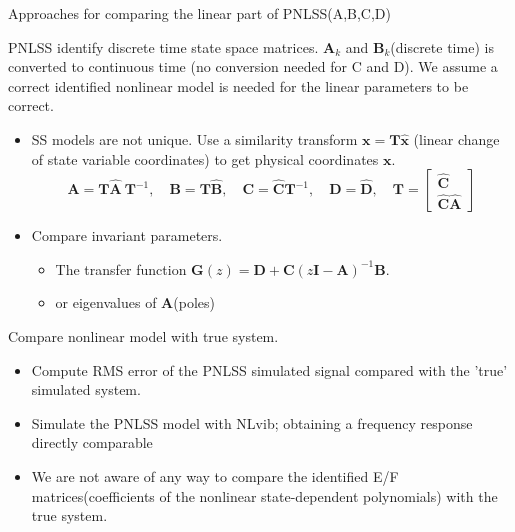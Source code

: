 \documentclass[9pt]{beamer}
\newcommand{\vect}[1]{\mathbf{#1}}
\begin{document}
\begin{frame}{Approaches for comparing the linear part of PNLSS(A,B,C,D)}

  PNLSS identify discrete time state space matrices. $\vect A_k$ and $\vect
  B_k$(discrete time) is converted to continuous time (no conversion needed for
  C and D). We assume a correct identified nonlinear model is needed for the
  linear parameters to be correct.

  \begin{itemize}
  \item SS models are not unique. Use a similarity transform $ \vect x = \vect T
    \hat {\vect x}$ (linear change of state variable coordinates) to get
    physical coordinates $\vect x$.\footnotemark[1]
    \begin{equation}
      \label{eq:similarity_transform}
      \vect A = \vect T \hat {\vect A} \ \vect T^{-1}, \quad
      \vect B = \vect T \hat {\vect B}, \quad
      \vect C = \hat {\vect C} \vect T^{-1}, \quad
      \vect D = \hat {\vect D}, \quad
      \vect T =
      \begin{bmatrix}
        \hat {\vect C} \\  \hat {\vect C}  \hat {\vect A}
      \end{bmatrix}
    \end{equation}
  \item Compare invariant parameters.
    \begin{itemize}
    \item The transfer function $\vect G(z) = \vect D + \vect C(z \vect I -
      \vect A)^{-1}\vect B$.\\
    \item or eigenvalues of $\vect A$(poles)
    \end{itemize}
  \end{itemize}


\end{frame}


\begin{frame}{Compare nonlinear model with true system.}
  \begin{itemize}
  \item Compute RMS error of the PNLSS simulated signal compared with the 'true'
    simulated system.
  \item Simulate the PNLSS model with NLvib; obtaining a frequency response directly comparable
  \item We are not aware of any way to compare the identified E/F
    matrices(coefficients of the nonlinear state-dependent polynomials) with the
    true system.
  \end{itemize}
\end{frame}
\end{document}

